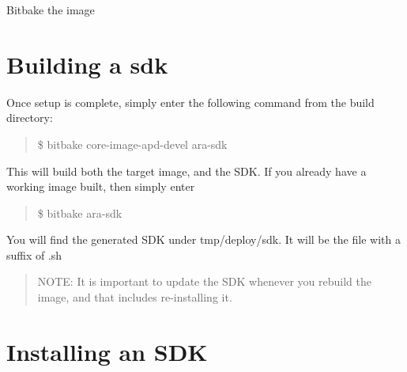 \begin{DoxyEnumerate}
\item Bitbake the image 
 
\end{DoxyEnumerate}\hypertarget{sdk_introduction}{}\section{Building a sdk}\label{sdk_introduction}

\begin{DoxyItemize}
\item Once setup is complete, simply enter the following command from the build directory\+:
\end{DoxyItemize}

\begin{quote}
\$ bitbake core-\/image-\/apd-\/devel ara-\/sdk \end{quote}



\begin{DoxyItemize}
\item This will build both the target image, and the S\+DK. If you already have a working image built, then simply enter
\end{DoxyItemize}

\begin{quote}
\$ bitbake ara-\/sdk \end{quote}



\begin{DoxyItemize}
\item You will find the generated S\+DK under tmp/deploy/sdk. It will be the file with a suffix of .sh
\end{DoxyItemize}

\begin{quote}
N\+O\+TE\+: It is important to update the S\+DK whenever you rebuild the image, and that includes re-\/installing it. \end{quote}


\section*{Installing an S\+DK}



